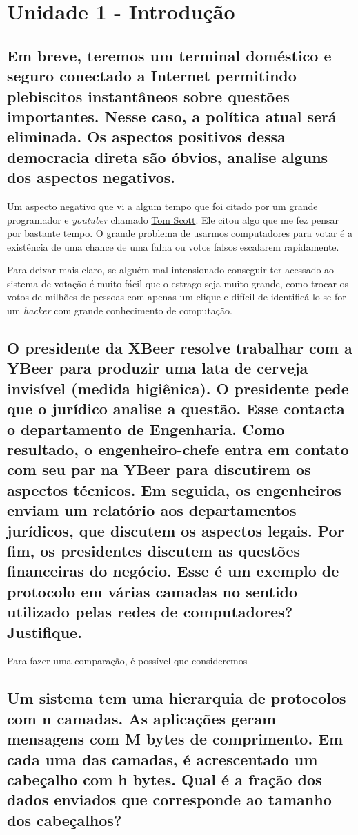\section{Unidade 1 - Introdução}
\subsection{Em breve, teremos um terminal doméstico e seguro conectado a
Internet permitindo plebiscitos instantâneos sobre questões
importantes. Nesse caso, a política atual será eliminada. Os
aspectos positivos dessa democracia direta são óbvios, analise
alguns dos aspectos negativos.}

    Um aspecto negativo que vi a algum tempo que foi citado
    por um grande programador e \emph{youtuber} chamado 
    \hyperlink{https://www.youtube.com/c/TomScottGo}{Tom Scott}.
    Ele citou algo que me fez pensar por bastante tempo.
    O grande problema de usarmos computadores para votar é a existência
    de uma chance de uma falha ou votos falsos escalarem rapidamente\cite{WEBSITE:1}. 

    Para deixar mais claro,
    se alguém mal intensionado conseguir ter acessado ao sistema de votação
    é muito fácil que o estrago seja muito grande, como trocar os votos de milhões
    de pessoas com apenas um clique e difícil de identificá-lo se for um 
    \emph{hacker} com grande conhecimento de computação.

\subsection{O presidente da XBeer resolve trabalhar com a YBeer para produzir
uma lata de cerveja invisível (medida higiênica). O presidente pede
que o jurídico analise a questão. Esse contacta o departamento de
Engenharia. Como resultado, o engenheiro-chefe entra em contato
com seu par na YBeer para discutirem os aspectos técnicos. Em
seguida, os engenheiros enviam um relatório aos departamentos
jurídicos, que discutem os aspectos legais. Por fim, os presidentes
discutem as questões financeiras do negócio. Esse é um exemplo de
protocolo em várias camadas no sentido utilizado pelas redes de
computadores? Justifique.}

    Para fazer uma comparação, é possível que consideremos 

\subsection{Um sistema tem uma hierarquia de protocolos com n camadas. As
aplicações geram mensagens com M bytes de comprimento. Em
cada uma das camadas, é acrescentado um cabeçalho com h bytes.
Qual é a fração dos dados enviados que corresponde ao tamanho
dos cabeçalhos?}

